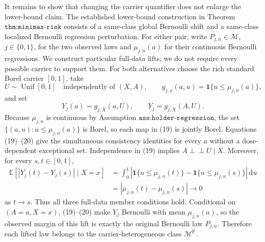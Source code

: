 It remains to show that changing the carrier quantifier does not enlarge the lower-bound claim.  The established lower-bound construction in Theorem \(\texttt{thm:minimax-risk}\) consists of a same-class global Bernoulli shift and a same-class localized Bernoulli regression perturbation.  For either pair, write \(P_{j,n}\in\mathcal M\), \(j\in\{0,1\}\), for the two observed laws and \(\mu_{j,n}(a)\) for their continuous Bernoulli regressions.  We construct particular full-data lifts; we do not require every possible carrier to support them.  For both alternatives choose the rich standard Borel carrier \([0,1]\), take
\[
 U\sim\operatorname{Unif}[0,1]
 \quad\text{independently of }(X,A),
 \qquad
 g_{j,x}(a,u)=\mathbf 1\{u\leq\mu_{j,n}(a)\},
 \tag{19}
\]
and set
\[
 Y_j(a)=g_{j,X}(a,U),
 \qquad
 Y_j=g_{j,X}(A,U).
 \tag{20}
\]
Because \(\mu_{j,n}\) is continuous by Assumption \(\texttt{ass:holder-regression}\), the set \(\{(a,u):u\leq\mu_{j,n}(a)\}\) is Borel, so each map in (19) is jointly Borel.  Equations (19)--(20) give the simultaneous consistency identities for every \(a\) without a dose-dependent exceptional set.  Independence in (19) implies \(A\perp\!\!\!\perp U\mid X\).  Moreover, for every \(s,t\in[0,1]\),
\[
\begin{aligned}
 \mathbb E[|Y_j(t)-Y_j(s)|\mid X=x]
 &=\int_0^1
 |\mathbf 1\{u\leq\mu_{j,n}(t)\}
  -\mathbf 1\{u\leq\mu_{j,n}(s)\}|\,\mathrm du\\
 &=|\mu_{j,n}(t)-\mu_{j,n}(s)|\longrightarrow0
\end{aligned}
\tag{21}
\]
as \(t\to s\).  Thus all three full-data member conditions hold.  Conditional on \((A=a,X=x)\), (19)--(20) make \(Y_j\) Bernoulli with mean \(\mu_{j,n}(a)\), so the observed margin of this lift is exactly the original Bernoulli law \(P_{j,n}\).  Therefore each lifted law belongs to the carrier-heterogeneous class \(\mathcal M^{\mathrm F}\).

